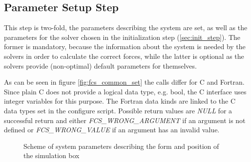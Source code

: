 \subsection{Parameter Setup Step}
\label{sec:par_setup}
This step is two-fold, the parameters describing the system are set, as well as the parameters for the solver
chosen in the initialization step (\ref{sec:init_step}). The former is mandatory, because the information about
the system is needed by the solvers in order to calculate the correct forces, while the latter is optional as
the solvers provide (non-optimal) default parameters for themselves.

As can be seen in figure \ref{fig:fcs_common_set} the calls differ for C and Fortran. Since plain C does not provide a logical data type, e.g. bool,
the C interface uses integer variables for this purpose. The Fortran data kinds are linked to the C data types set in the configure script. Possible
return values are \textit{NULL} for a successful return and either \newline\textit{FCS\_WRONG\_ARGUMENT} if an argument is not defined or \textit{FCS\_WRONG\_VALUE}
if an argument has an invalid value.\\

\begin{figure}[htb]
\begin{center}
\end{center}
\caption{Scheme of system parameters describing the form and position of the simulation box}
\label{fig:interface_box_scheme}
\end{figure}

